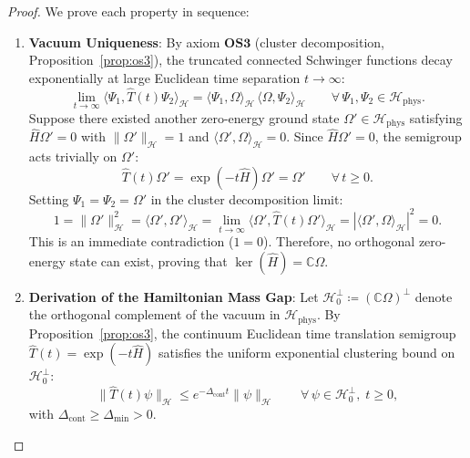 \begin{proof}
We prove each property in sequence:
\begin{enumerate}[label=\textbf{Step \arabic*:}, leftmargin=*]
    \item \textbf{Vacuum Uniqueness}:
    By axiom $\mathbf{OS3}$ (cluster decomposition, Proposition~\ref{prop:os3}), the truncated connected Schwinger functions decay exponentially at large Euclidean time separation $t \to \infty$:
    \begin{equation}
    \lim_{t \to \infty} \langle \Psi_1, \hat{T}(t) \Psi_2 \rangle_{\mathcal{H}} = \langle \Psi_1, \Omega \rangle_{\mathcal{H}} \, \langle \Omega, \Psi_2 \rangle_{\mathcal{H}} \qquad \forall \, \Psi_1, \Psi_2 \in \mathcal{H}_{\mathrm{phys}}.
    \end{equation}
    Suppose there existed another zero-energy ground state $\Omega' \in \mathcal{H}_{\mathrm{phys}}$ satisfying $\hat{H} \Omega' = 0$ with $\|\Omega'\|_{\mathcal{H}} = 1$ and $\langle \Omega', \Omega \rangle_{\mathcal{H}} = 0$. Since $\hat{H} \Omega' = 0$, the semigroup acts trivially on $\Omega'$:
    \begin{equation}
    \hat{T}(t) \Omega' = \exp(-t \hat{H}) \Omega' = \Omega' \qquad \forall \, t \ge 0.
    \end{equation}
    Setting $\Psi_1 = \Psi_2 = \Omega'$ in the cluster decomposition limit:
    \begin{equation}
    1 = \|\Omega'\|_{\mathcal{H}}^2 = \langle \Omega', \Omega' \rangle_{\mathcal{H}} = \lim_{t \to \infty} \langle \Omega', \hat{T}(t) \Omega' \rangle_{\mathcal{H}} = |\langle \Omega', \Omega \rangle_{\mathcal{H}}|^2 = 0.
    \end{equation}
    This is an immediate contradiction ($1 = 0$). Therefore, no orthogonal zero-energy state can exist, proving that $\ker(\hat{H}) = \mathbb{C} \Omega$.

    \item \textbf{Derivation of the Hamiltonian Mass Gap}:
    Let $\mathcal{H}_0^\perp \coloneqq (\mathbb{C} \Omega)^\perp$ denote the orthogonal complement of the vacuum in $\mathcal{H}_{\mathrm{phys}}$.
    By Proposition~\ref{prop:os3}, the continuum Euclidean time translation semigroup $\hat{T}(t) = \exp(-t \hat{H})$ satisfies the uniform exponential clustering bound on $\mathcal{H}_0^\perp$:
    \begin{equation}
    \|\hat{T}(t) \psi\|_{\mathcal{H}} \le e^{-\Delta_{\mathrm{cont}} t} \|\psi\|_{\mathcal{H}} \qquad \forall \, \psi \in \mathcal{H}_0^\perp, \; t \ge 0,
    \end{equation}
    with $\Delta_{\mathrm{cont}} \ge \Delta_{\min} > 0$.


\end{enumerate}
\end{proof}
